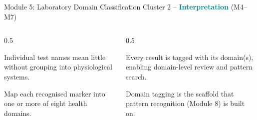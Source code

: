 \documentclass[9pt,aspectratio=169]{beamer}
\begin{document}
\begin{frame}{Module 5: Laboratory Domain Classification}
\textcolor{black!55}{\scriptsize Cluster 2 -- \textcolor{teal}{\textbf{Interpretation}} (M4--M7)}\\[2pt]
\begin{columns}[T,onlytextwidth]
\begin{column}{0.5\textwidth}
\begin{tcolorbox}[colback=blue!7,colframe=blue!55!black,title=\textbf{Motivation},boxrule=0.6pt,arc=1mm,left=5pt,right=5pt,top=3pt,bottom=3pt,fonttitle=\small]
\footnotesize Individual test names mean little without grouping into physiological systems.
\end{tcolorbox}
\vspace{5pt}
\begin{tcolorbox}[colback=teal!7,colframe=teal!55!black,title=\textbf{Method},boxrule=0.6pt,arc=1mm,left=5pt,right=5pt,top=3pt,bottom=3pt,fonttitle=\small]
\footnotesize Map each recognised marker into one or more of eight health domains.
\end{tcolorbox}
\end{column}
\begin{column}{0.5\textwidth}
\begin{tcolorbox}[colback=green!8,colframe=green!45!black,title=\textbf{Result},boxrule=0.6pt,arc=1mm,left=5pt,right=5pt,top=3pt,bottom=3pt,fonttitle=\small]
\footnotesize Every result is tagged with its domain(s), enabling domain-level review and pattern search.
\end{tcolorbox}
\vspace{5pt}
\begin{tcolorbox}[colback=orange!10,colframe=orange!65!black,title=\textbf{Conclusion},boxrule=0.6pt,arc=1mm,left=5pt,right=5pt,top=3pt,bottom=3pt,fonttitle=\small]
\footnotesize Domain tagging is the scaffold that pattern recognition (Module 8) is built on.
\end{tcolorbox}
\end{column}
\end{columns}
\end{frame}
\end{document}
